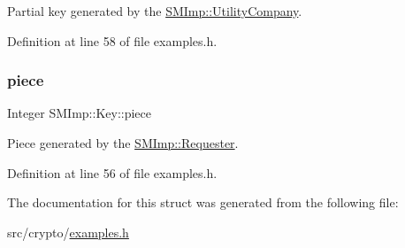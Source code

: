 Partial key generated by the \hyperlink{classSMImp_1_1UtilityCompany}{S\+M\+Imp\+::\+Utility\+Company}. 



Definition at line 58 of file examples.\+h.

\mbox{\label{structSMImp_1_1Key_a10781e222703128151623806fdaa0b66}} 
\subsubsection{\texorpdfstring{piece}{piece}}
{\footnotesize\ttfamily Integer S\+M\+Imp\+::\+Key\+::piece}



Piece generated by the \hyperlink{classSMImp_1_1Requester}{S\+M\+Imp\+::\+Requester}. 



Definition at line 56 of file examples.\+h.



The documentation for this struct was generated from the following file\+:\begin{DoxyCompactItemize}
\item 
src/crypto/\hyperlink{examples_8h}{examples.\+h}\end{DoxyCompactItemize}
